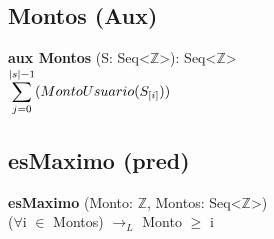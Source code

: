 \documentclass{article}
\begin{document}
\subsection{Montos (Aux)}
\textbf{aux Montos} (S: Seq\textless$\mathds{Z}$\textgreater): Seq\textless$\mathds{Z}$\textgreater \\
$\mathlarger\sum\limits_{j=0}^{|s|-1} (MontoUsuario(S_{[i]}))$


\subsection{esMaximo (pred)}
\textbf{esMaximo} (Monto: $\mathds{Z}$, Montos: Seq\textless$\mathds{Z}$\textgreater)\\
($\forall$i $\in$ Montos) $\rightarrow_L$ Monto $\geq$ i
\end{document}
